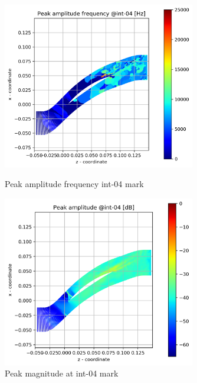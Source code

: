 \begin{figure}[ht]
  \centering
  \includegraphics[width=0.75\textwidth]{Figures/int-04-peak-freq.png}
  \caption{Peak amplitude frequency int-04 mark} \label{int-04-peak-freq}
  
  \vspace*{\floatsep}%

  \includegraphics[width=0.75\textwidth]{Figures/int-04-peak-mag.png}
  \caption{Peak magnitude at int-04 mark} \label{int-04-peak-mag}
\end{figure}


